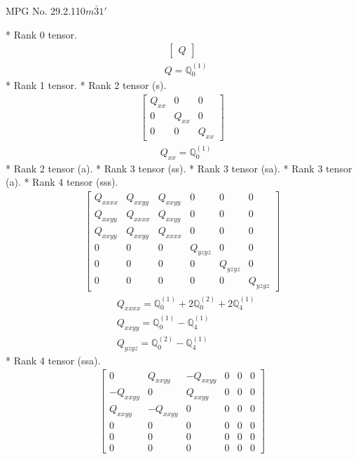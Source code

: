 \documentclass[fleqn,8pt,landscape]{jsarticle}
\begin{document}
\setcounter{MaxMatrixCols}{32}

\renewcommand{\tablename}{Table~}
\renewcommand{\figurename}{Figure~}
\begin{center}
\LARGE
MPG No. 29.2.110\quad$m\bar{3}1'$
\end{center}
* Rank 0 tensor.
\begin{align*}
\begin{bmatrix} Q \end{bmatrix}
\end{align*}
\begin{align*}
& Q = \mathbb{Q}_{0}^{(1)}
\end{align*}
* Rank 1 tensor.
* Rank 2 tensor (s).
\begin{align*}
\begin{bmatrix} Q_{xx} & 0 & 0 \\ 0 & Q_{xx} & 0 \\ 0 & 0 & Q_{xx} \end{bmatrix}
\end{align*}
\begin{align*}
& Q_{xx} = \mathbb{Q}_{0}^{(1)}
\end{align*}
* Rank 2 tensor (a).
* Rank 3 tensor (ss).
* Rank 3 tensor (sa).
* Rank 3 tensor (a).
* Rank 4 tensor (sss).
\begin{align*}
\begin{bmatrix} Q_{xxxx} & Q_{xxyy} & Q_{xxyy} & 0 & 0 & 0 \\ Q_{xxyy} & Q_{xxxx} & Q_{xxyy} & 0 & 0 & 0 \\ Q_{xxyy} & Q_{xxyy} & Q_{xxxx} & 0 & 0 & 0 \\ 0 & 0 & 0 & Q_{yzyz} & 0 & 0 \\ 0 & 0 & 0 & 0 & Q_{yzyz} & 0 \\ 0 & 0 & 0 & 0 & 0 & Q_{yzyz} \end{bmatrix}
\end{align*}
\begin{align*}
& Q_{xxxx} = \mathbb{Q}_{0}^{(1)} + 2 \mathbb{Q}_{0}^{(2)} + 2 \mathbb{Q}_{4}^{(1)} \\
& Q_{xxyy} = \mathbb{Q}_{0}^{(1)} - \mathbb{Q}_{4}^{(1)} \\
& Q_{yzyz} = \mathbb{Q}_{0}^{(2)} - \mathbb{Q}_{4}^{(1)}
\end{align*}
* Rank 4 tensor (ssa).
\begin{align*}
\begin{bmatrix} 0 & Q_{xxyy} & - Q_{xxyy} & 0 & 0 & 0 \\ - Q_{xxyy} & 0 & Q_{xxyy} & 0 & 0 & 0 \\ Q_{xxyy} & - Q_{xxyy} & 0 & 0 & 0 & 0 \\ 0 & 0 & 0 & 0 & 0 & 0 \\ 0 & 0 & 0 & 0 & 0 & 0 \\ 0 & 0 & 0 & 0 & 0 & 0 \end{bmatrix}
\end{align*}
\end{document}
